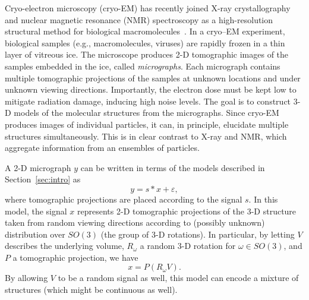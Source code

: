 \documentclass[12pt]{article}
\newcommand{\1}{\mathbf{1}}
\theoremstyle{plain}
\theoremstyle{definition}
\theoremstyle{remark}
\theoremstyle{plain}
\theoremstyle{remark}
\theoremstyle{plain}
\theoremstyle{plain}
\theoremstyle{plain}
\numberwithin{equation}{section}
\begin{document}
Cryo-electron microscopy (cryo-EM)  has recently joined X-ray crystallography and nuclear magnetic resonance (NMR) spectroscopy as a high-resolution structural method for biological macromolecules~\cite{frank2006three,kuhlbrandt2014resolution,bartesaghi20152}.
In a cryo--EM experiment, biological samples (e.g., macromolecules, viruses) are rapidly frozen in a thin layer of vitreous ice.
The microscope produces 2-D tomographic images of the samples embedded in the ice, called \emph{micrographs}. Each micrograph contains multiple tomographic projections of the samples at unknown locations and under unknown viewing directions. 
Importantly, the electron dose must be kept low to mitigate  radiation damage, inducing high noise levels.
The goal is to construct 3-D models of the molecular structures from the micrographs. 
Since  cryo-EM produces images of individual particles, it can, in principle, elucidate multiple  structures simultaneously.
This is in clear contrast to  X-ray and NMR, which aggregate information from an ensembles of
particles.

A 2-D micrograph $y$ can be written in terms 
of the models described in Section~\ref{sec:intro} as
\begin{equation}  \label{eq:model_cryo}
y  =   s \ast x + \varepsilon,
\end{equation}
where tomographic projections are placed according to the signal $s$. In this model, the signal $x$ represents 2-D tomographic projections of the 3-D structure taken from  random viewing directions according to (possibly unknown) distribution over $SO(3)$ (the group of 3-D rotations). In particular, by letting $V$ describes the underlying volume, $R_\omega$ a random 3-D rotation for $\omega\in SO(3)$, and $P$ a tomographic projection, we have
\begin{equation} \label{eq:cryoEM}
x= P(R_\omega V).
\end{equation}
By allowing $V$ to be a random signal as well, this model can encode a mixture of structures  
(which might be continuous as well).
\end{document}
